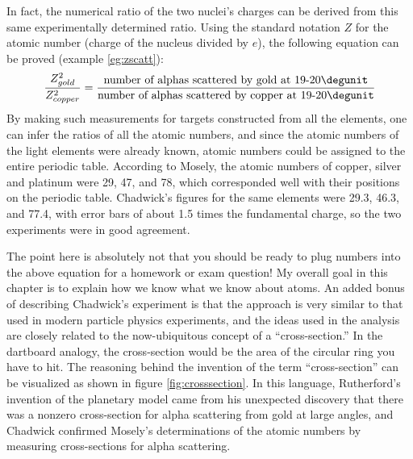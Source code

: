         In fact, the numerical ratio of the two nuclei's charges can
        be derived from this same experimentally determined ratio.
        Using the standard notation $Z$ for the atomic number
        (charge of the nucleus divided by $e$), the following
        equation can be proved (example \ref{eg:zscatt}):
        \begin{equation*}
                \frac{Z_{gold}^2}{Z_{copper}^2}
                        = \frac{\text{number of alphas scattered by gold at 19-20$\degunit$}}
                                {\text{number of alphas scattered by copper at 19-20$\degunit$}}
        \end{equation*}
        By making such measurements for targets constructed from all
        the elements, one can infer the ratios of all the atomic
        numbers, and since the atomic numbers of the light elements
        were already known, atomic numbers could be assigned to the
        entire periodic table. According to Mosely, the atomic
        numbers of copper, silver and platinum were 29, 47, and 78,
        which corresponded well with their positions on the periodic
        table. Chadwick's figures for the same elements were 29.3,
        46.3, and 77.4, with error bars of about 1.5 times the
        fundamental charge, so the two experiments were in good agreement.

\enlargethispage{-2\baselineskip}
        The point here is absolutely not that you should be ready to
        plug numbers into the above equation for a homework or exam
        question! My overall goal in this chapter is to explain how
        we know what we know about atoms. An added bonus of
        describing Chadwick's experiment is that the approach is
        very similar to that used in modern particle physics
        experiments, and the ideas used in the analysis are closely
        related to the now-ubiquitous concept of a ``cross-section.''
        In the dartboard analogy, the cross-section would be the
        area of the circular ring you have to hit. The reasoning
        behind the invention of the term ``cross-section'' can be
        visualized as shown in figure \ref{fig:crosssection}. In this language,
        Rutherford's invention of the planetary model came from his
        unexpected discovery that there was a nonzero cross-section
        for alpha scattering from gold at large angles, and Chadwick
        confirmed Mosely's determinations of the atomic numbers by
        measuring cross-sections for alpha scattering. 

